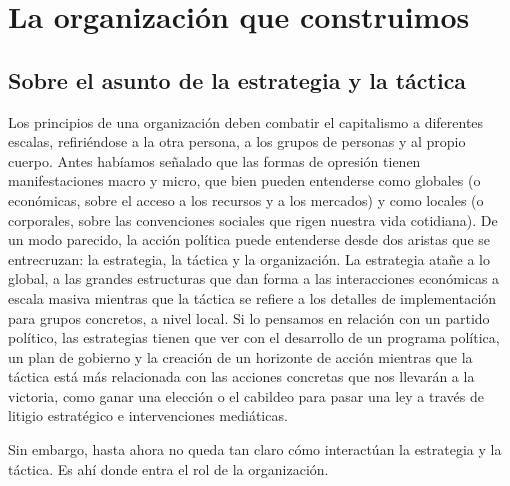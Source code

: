 \chapter{La organización que construimos}
\label{cha:organizacion}

\section{Sobre el asunto de la estrategia y la táctica}
\label{sec:tacticaestrategica}

Los principios de una organización deben combatir el capitalismo a diferentes escalas, refiriéndose a la otra persona, a los grupos de personas y al propio cuerpo. Antes habíamos señalado que las formas de opresión tienen manifestaciones macro y micro, que bien pueden entenderse como globales (o económicas, sobre el acceso a los recursos y a los mercados) y como locales (o corporales, sobre las convenciones sociales que rigen nuestra vida cotidiana). De un modo parecido, la acción política puede entenderse desde dos aristas que se entrecruzan: la estrategia, la táctica y la organización. La estrategia atañe a lo global, a las grandes estructuras que dan forma a las interacciones económicas a escala masiva mientras que la táctica se refiere a los detalles de implementación para grupos concretos, a nivel local. Si lo pensamos en relación con un partido político, las estrategias tienen que ver con el desarrollo de un programa política, un plan de gobierno y la creación de un horizonte de acción mientras que la táctica está más relacionada con las acciones concretas que nos llevarán a la victoria, como ganar una elección o el cabildeo para pasar una ley a través de litigio estratégico e intervenciones mediáticas.

Sin embargo, hasta ahora no queda tan claro cómo interactúan la estrategia y la táctica. Es ahí donde entra el rol de la organización.

